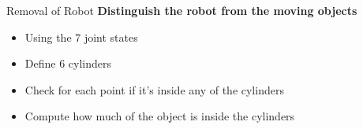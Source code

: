\begin{frame}{Removal of Robot}
\textbf{Distinguish the robot from the moving objects}
	\begin{itemize}
	\item Using the 7 joint states
	\item Define 6 cylinders
	\item Check for each point if it's inside any of the cylinders
	\item Compute how much of the object is inside the cylinders
	\end{itemize}
		
\end{frame}